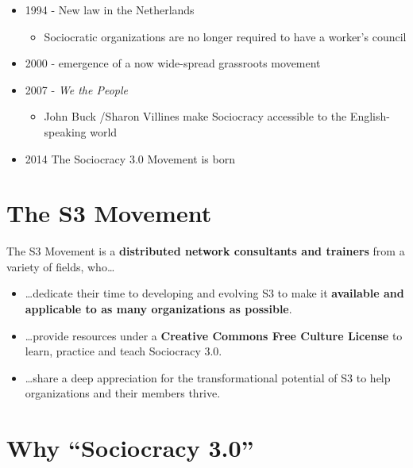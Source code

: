 \begin{itemize}
\begin{itemize}
\end{itemize}

\item 1994 - New law in the Netherlands

\begin{itemize}
\item Sociocratic organizations are no longer required to have a worker’s council

\end{itemize}

\item 2000 - emergence of a now wide-spread grassroots movement

\item 2007 - \emph{We the People}

\begin{itemize}
\item John Buck \slash  Sharon Villines make Sociocracy accessible to the English-speaking world

\end{itemize}

\item 2014 The Sociocracy 3.0 Movement is born

\end{itemize}

\chapter{The S3 Movement}
\label{thes3movement}

The S3 Movement is a \textbf{distributed network consultants and trainers} from a variety of fields, who{\ldots}

\begin{itemize}
\item {\ldots}dedicate their time to developing and evolving S3 to make it \textbf{available and applicable to as many organizations as possible}.

\item {\ldots}provide resources under a \textbf{Creative Commons Free Culture License} to learn, practice and teach Sociocracy 3.0.

\item {\ldots}share a deep appreciation for the transformational potential of S3 to help organizations and their members thrive.

\end{itemize}

\chapter{Why ``Sociocracy 3.0''}
\label{whysociocracy3.0}

